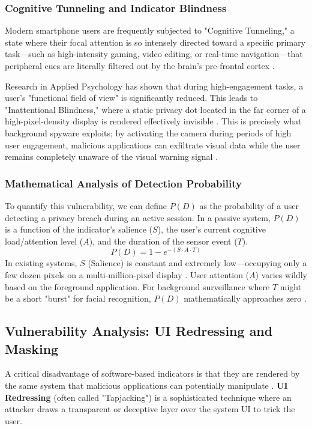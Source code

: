 \documentclass[12pt,a4paper]{report}
\begin{document}
\begin{enumerate}
    \subsubsection{Cognitive Tunneling and Indicator Blindness}
    Modern smartphone users are frequently subjected to "Cognitive Tunneling," a state where their focal attention is so intensely directed toward a specific primary task—such as high-intensity gaming, video editing, or real-time navigation—that peripheral cues are literally filtered out by the brain's pre-frontal cortex \cite{contextaware}.

    Research in Applied Psychology has shown that during high-engagement tasks, a user's "functional field of view" is significantly reduced. This leads to "Inattentional Blindness," where a static privacy dot located in the far corner of a high-pixel-density display is rendered effectively invisible \cite{privacydot}. This is precisely what background spyware exploits; by activating the camera during periods of high user engagement, malicious applications can exfiltrate visual data while the user remains completely unaware of the visual warning signal \cite{placeraider}.

    \subsubsection{Mathematical Analysis of Detection Probability}
    To quantify this vulnerability, we can define $P(D)$ as the probability of a user detecting a privacy breach during an active session. In a passive system, $P(D)$ is a function of the indicator's salience ($S$), the user's current cognitive load/attention level ($A$), and the duration of the sensor event ($T$).
    $$P(D) = 1 - e^{-(S \cdot A \cdot T)}$$
    In existing systems, $S$ (Salience) is constant and extremely low—occupying only a few dozen pixels on a multi-million-pixel display \cite{privacydot}. User attention ($A$) varies wildly based on the foreground application. For background surveillance where $T$ might be a short "burst" for facial recognition, $P(D)$ mathematically approaches zero \cite{checkmarx}.

    \subsection{Vulnerability Analysis: UI Redressing and Masking}
    A critical disadvantage of software-based indicators is that they are rendered by the same system that malicious applications can potentially manipulate \cite{malwaresurvey}. \textbf{UI Redressing} (often called "Tapjacking") is a sophisticated technique where an attacker draws a transparent or deceptive layer over the system UI to trick the user.


\end{enumerate}
\end{document}

